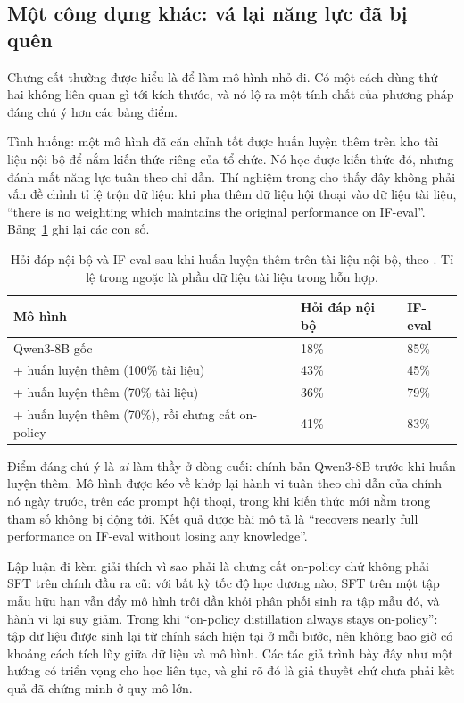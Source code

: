 \subsection{Một công dụng khác: vá lại năng lực đã bị quên}
\label{ssec:opd_personalization}

Chưng cất thường được hiểu là để làm mô hình nhỏ đi. Có một cách dùng thứ hai không liên quan gì tới kích thước, và nó lộ ra một tính chất của phương pháp đáng chú ý hơn các bảng điểm.

Tình huống: một mô hình đã căn chỉnh tốt được huấn luyện thêm trên kho tài liệu nội bộ để nắm kiến thức riêng của tổ chức. Nó học được kiến thức đó, nhưng đánh mất năng lực tuân theo chỉ dẫn. Thí nghiệm trong \cite{lu2025opd} cho thấy đây không phải vấn đề chỉnh tỉ lệ trộn dữ liệu: khi pha thêm dữ liệu hội thoại vào dữ liệu tài liệu, ``there is no weighting which maintains the original performance on IF-eval''. Bảng~\ref{tab:opd_personalization} ghi lại các con số.

\begin{table}[H]
\centering\small
\caption{Hỏi đáp nội bộ và IF-eval sau khi huấn luyện thêm trên tài liệu nội bộ, theo \cite{lu2025opd}. Tỉ lệ trong ngoặc là phần dữ liệu tài liệu trong hỗn hợp.}
\label{tab:opd_personalization}
\begin{tabularx}{\textwidth}{@{}Xll@{}}
\toprule
\textbf{Mô hình} & \textbf{Hỏi đáp nội bộ} & \textbf{IF-eval} \\
\midrule
Qwen3-8B gốc & 18\% & 85\% \\
\quad + huấn luyện thêm (100\% tài liệu) & 43\% & 45\% \\
\quad + huấn luyện thêm (70\% tài liệu) & 36\% & 79\% \\
\quad + huấn luyện thêm (70\%), rồi chưng cất on-policy & 41\% & 83\% \\
\bottomrule
\end{tabularx}
\end{table}

Điểm đáng chú ý là \emph{ai} làm thầy ở dòng cuối: chính bản Qwen3-8B trước khi huấn luyện thêm. Mô hình được kéo về khớp lại hành vi tuân theo chỉ dẫn của chính nó ngày trước, trên các prompt hội thoại, trong khi kiến thức mới nằm trong tham số không bị động tới. Kết quả được bài mô tả là ``recovers nearly full performance on IF-eval without losing any knowledge''.

Lập luận đi kèm giải thích vì sao phải là chưng cất on-policy chứ không phải SFT trên chính đầu ra cũ: với bất kỳ tốc độ học dương nào, SFT trên một tập mẫu hữu hạn vẫn đẩy mô hình trôi dần khỏi phân phối sinh ra tập mẫu đó, và hành vi lại suy giảm. Trong khi ``on-policy distillation always stays on-policy'': tập dữ liệu được sinh lại từ chính sách hiện tại ở mỗi bước, nên không bao giờ có khoảng cách tích lũy giữa dữ liệu và mô hình. Các tác giả trình bày đây như một hướng có triển vọng cho học liên tục, và ghi rõ đó là giả thuyết chứ chưa phải kết quả đã chứng minh ở quy mô lớn.


